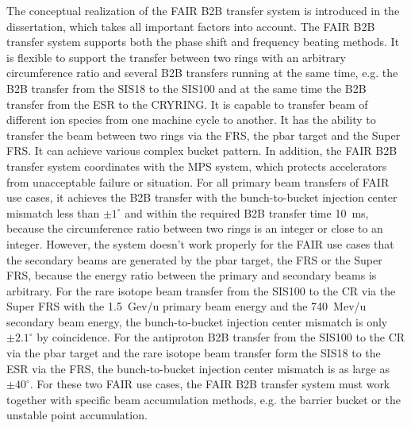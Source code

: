 The conceptual realization of the FAIR B2B transfer system is introduced in the dissertation, which takes all important factors into account. The FAIR B2B transfer system supports both the phase shift and frequency beating methods. It is flexible to support the transfer between two rings with an arbitrary circumference ratio and several B2B transfers running at the same time, e.g. the B2B transfer from the SIS18 to the SIS100 and at the same time the B2B transfer from the ESR to the CRYRING. It is capable to transfer beam of different ion species from one machine cycle to another. It has the ability to transfer the beam between two rings via the FRS, the pbar target and the Super FRS. It can achieve various complex bucket pattern. In addition, the FAIR B2B transfer system coordinates with the MPS system, which protects accelerators from unacceptable failure or situation. For all primary beam transfers of FAIR use cases, it achieves the B2B transfer with the bunch-to-bucket injection center mismatch less than $\pm1^\circ$ and within the required B2B transfer time \SI{10}{\ms}, because the circumference ratio between two rings is an integer or close to an integer. However, the system doesn't work properly for the FAIR use cases that the secondary beams are generated by the pbar target, the FRS or the Super FRS, because the energy ratio between the primary and secondary beams is arbitrary. For the rare isotope beam transfer from the SIS100 to the CR via the Super FRS with the \SI{1.5}{Gev/u} primary beam energy and the \SI{740}{Mev/u} secondary beam energy, the bunch-to-bucket injection center mismatch is only $\pm2.1^\circ$ by coincidence. For the antiproton B2B transfer from the SIS100 to the CR via the pbar target and the rare isotope beam transfer form the SIS18 to the ESR via the FRS, the bunch-to-bucket injection center mismatch is as large as $\pm40^\circ$. For these two FAIR use cases, the FAIR B2B transfer system must work together with specific beam accumulation methods, e.g. the barrier bucket or the unstable point accumulation.
 

